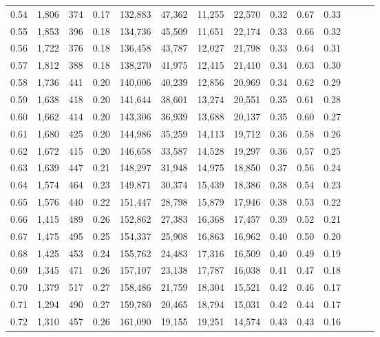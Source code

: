 \begin{tabular}{rrrrrrrrrrrrrr}
0.54 &  1,806 &  374 &  0.17 &  132,883 &   47,362 &  11,255 &  22,570 &  0.32 &  0.67 &      0.33 \\
0.55 &  1,853 &  396 &  0.18 &  134,736 &   45,509 &  11,651 &  22,174 &  0.33 &  0.66 &      0.32 \\
0.56 &  1,722 &  376 &  0.18 &  136,458 &   43,787 &  12,027 &  21,798 &  0.33 &  0.64 &      0.31 \\
0.57 &  1,812 &  388 &  0.18 &  138,270 &   41,975 &  12,415 &  21,410 &  0.34 &  0.63 &      0.30 \\
0.58 &  1,736 &  441 &  0.20 &  140,006 &   40,239 &  12,856 &  20,969 &  0.34 &  0.62 &      0.29 \\
0.59 &  1,638 &  418 &  0.20 &  141,644 &   38,601 &  13,274 &  20,551 &  0.35 &  0.61 &      0.28 \\
0.60 &  1,662 &  414 &  0.20 &  143,306 &   36,939 &  13,688 &  20,137 &  0.35 &  0.60 &      0.27 \\
0.61 &  1,680 &  425 &  0.20 &  144,986 &   35,259 &  14,113 &  19,712 &  0.36 &  0.58 &      0.26 \\
0.62 &  1,672 &  415 &  0.20 &  146,658 &   33,587 &  14,528 &  19,297 &  0.36 &  0.57 &      0.25 \\
0.63 &  1,639 &  447 &  0.21 &  148,297 &   31,948 &  14,975 &  18,850 &  0.37 &  0.56 &      0.24 \\
0.64 &  1,574 &  464 &  0.23 &  149,871 &   30,374 &  15,439 &  18,386 &  0.38 &  0.54 &      0.23 \\
0.65 &  1,576 &  440 &  0.22 &  151,447 &   28,798 &  15,879 &  17,946 &  0.38 &  0.53 &      0.22 \\
0.66 &  1,415 &  489 &  0.26 &  152,862 &   27,383 &  16,368 &  17,457 &  0.39 &  0.52 &      0.21 \\
0.67 &  1,475 &  495 &  0.25 &  154,337 &   25,908 &  16,863 &  16,962 &  0.40 &  0.50 &      0.20 \\
0.68 &  1,425 &  453 &  0.24 &  155,762 &   24,483 &  17,316 &  16,509 &  0.40 &  0.49 &      0.19 \\
0.69 &  1,345 &  471 &  0.26 &  157,107 &   23,138 &  17,787 &  16,038 &  0.41 &  0.47 &      0.18 \\
0.70 &  1,379 &  517 &  0.27 &  158,486 &   21,759 &  18,304 &  15,521 &  0.42 &  0.46 &      0.17 \\
0.71 &  1,294 &  490 &  0.27 &  159,780 &   20,465 &  18,794 &  15,031 &  0.42 &  0.44 &      0.17 \\
0.72 &  1,310 &  457 &  0.26 &  161,090 &   19,155 &  19,251 &  14,574 &  0.43 &  0.43 &      0.16 \\

\end{tabular}
